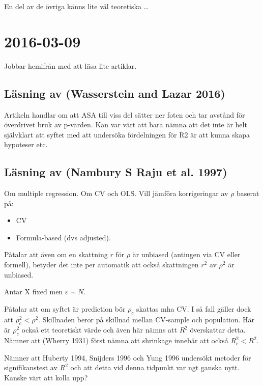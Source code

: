 \documentclass[]{article}
\providecommand{\tightlist}{%
  \setlength{\itemsep}{0pt}\setlength{\parskip}{0pt}}
\begin{document}
En del av de övriga känns lite väl teoretiska \ldots{}

\section{2016-03-09}\label{section-2}

Jobbar hemifrån med att läsa lite artiklar.

\subsection{Läsning av (Wasserstein and Lazar
2016)}\label{lasning-av-wasserstein2016}

Artikeln handlar om att ASA till viss del sätter ner foten och tar
avstånd för överdrivet bruk av p-värden. Kan var värt att bara nämna att
det inte är helt självklart att syftet med att undersöka fördelningen
för R2 är att kunna skapa hypoteser etc.

\subsection{Läsning av (Nambury S Raju et al.
1997)}\label{lasning-av-raju1997}

Om multiple regression. Om CV och OLS. Vill jämföra korrigeringar av
\(\rho\) baserat på:

\begin{itemize}
\tightlist
\item
  CV
\item
  Formula-based (dvs adjusted).
\end{itemize}

Påtalar att även om en skattning \(r\) för \(\rho\) är unbiased
(antingen via CV eller formell), betyder det inte per automatik att
också skattningen \(r^2\) av \(\rho^2\) är unbiased.

Antar X fixed men \(\varepsilon \sim N\).

Påtalar att om syftet är prediction bör \(\rho_c\) skattas mha CV. I så
fall gäller dock att \(\rho_c^2 < \rho^2\). Skillnaden beror på skillnad
mellan CV-sample och population. Här är \(\rho_c^2\) också ett
teoretiskt värde och även här nämns att \(R^2\) överskattar detta.
Nämner att (Wherry 1931) först nämna att shrinkage innebär att också
\(R_c^2<R^2\).

Nämner att Huberty 1994, Snijders 1996 och Yung 1996 undersökt metoder
för signifikanstest av \(R^2\) och att detta vid denna tidpunkt var ngt
ganska nytt. Kanske värt att kolla upp?
\end{document}
